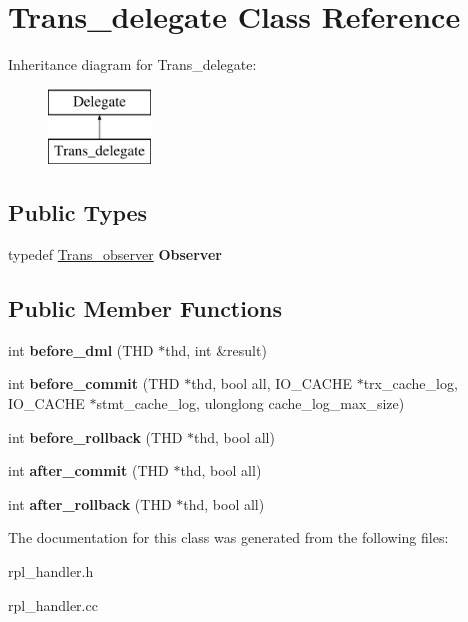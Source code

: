 \hypertarget{classTrans__delegate}{}\section{Trans\+\_\+delegate Class Reference}
\label{classTrans__delegate}
Inheritance diagram for Trans\+\_\+delegate\+:\begin{figure}[H]
\begin{center}
\leavevmode
\includegraphics[height=2.000000cm]{classTrans__delegate}
\end{center}
\end{figure}
\subsection*{Public Types}
\begin{DoxyCompactItemize}
\item 
\mbox{\label{classTrans__delegate_acb0906530c1770449db35695d5c79d2f}} 
typedef \mbox{\hyperlink{structTrans__observer}{Trans\+\_\+observer}} {\bfseries Observer}
\end{DoxyCompactItemize}
\subsection*{Public Member Functions}
\begin{DoxyCompactItemize}
\item 
\mbox{\label{classTrans__delegate_a323a4f5c20f35272fd4e2b5f722cfec1}} 
int {\bfseries before\+\_\+dml} (T\+HD $\ast$thd, int \&result)
\item 
\mbox{\label{classTrans__delegate_a0caf5460cb165350795d7988717dca6d}} 
int {\bfseries before\+\_\+commit} (T\+HD $\ast$thd, bool all, I\+O\+\_\+\+C\+A\+C\+HE $\ast$trx\+\_\+cache\+\_\+log, I\+O\+\_\+\+C\+A\+C\+HE $\ast$stmt\+\_\+cache\+\_\+log, ulonglong cache\+\_\+log\+\_\+max\+\_\+size)
\item 
\mbox{\label{classTrans__delegate_aadf27aebdae6a9e75dcbe2c784fdca9e}} 
int {\bfseries before\+\_\+rollback} (T\+HD $\ast$thd, bool all)
\item 
\mbox{\label{classTrans__delegate_a90b5e0d666c32ceb0541d2237196e5d3}} 
int {\bfseries after\+\_\+commit} (T\+HD $\ast$thd, bool all)
\item 
\mbox{\label{classTrans__delegate_a1ae358cc235220cf11f66c22f64565c9}} 
int {\bfseries after\+\_\+rollback} (T\+HD $\ast$thd, bool all)
\end{DoxyCompactItemize}


The documentation for this class was generated from the following files\+:\begin{DoxyCompactItemize}
\item 
rpl\+\_\+handler.\+h\item 
rpl\+\_\+handler.\+cc\end{DoxyCompactItemize}
